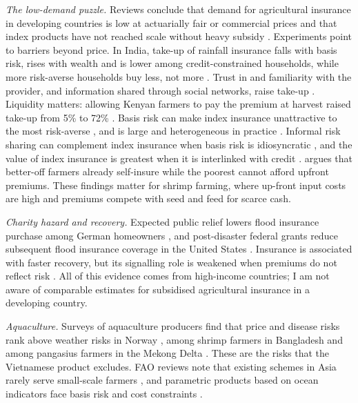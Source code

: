 \documentclass[11pt,a4paper]{article}
\begin{document}
\textit{The low-demand puzzle.} Reviews conclude that demand for agricultural insurance in developing countries is low at actuarially fair or commercial prices and that index products have not reached scale without heavy subsidy \parencite{colexiong2017,carter2017}. Experiments point to barriers beyond price. In India, take-up of rainfall insurance falls with basis risk, rises with wealth and is lower among credit-constrained households, while more risk-averse households buy less, not more \parencite{gine2008}. Trust in and familiarity with the provider, and information shared through social networks, raise take-up \parencite{gine2008,cai2015}. Liquidity matters: allowing Kenyan farmers to pay the premium at harvest raised take-up from 5\% to 72\% \parencite{casaburi2018}. Basis risk can make index insurance unattractive to the most risk-averse \parencite{clarke2016}, and is large and heterogeneous in practice \parencite{jensen2016}. Informal risk sharing can complement index insurance when basis risk is idiosyncratic \parencite{mobarak2013}, and the value of index insurance is greatest when it is interlinked with credit \parencite{carter2016}. \textcite{binswanger2012} argues that better-off farmers already self-insure while the poorest cannot afford upfront premiums. These findings matter for shrimp farming, where up-front input costs are high and premiums compete with seed and feed for scarce cash.

\textit{Charity hazard and recovery.} Expected public relief lowers flood insurance purchase among German homeowners \parencite{andor2020}, and post-disaster federal grants reduce subsequent flood insurance coverage in the United States \parencite{kousky2018}. Insurance is associated with faster recovery, but its signalling role is weakened when premiums do not reflect risk \parencite{kousky2019}. All of this evidence comes from high-income countries; I am not aware of comparable estimates for subsidised agricultural insurance in a developing country.

\textit{Aquaculture.} Surveys of aquaculture producers find that price and disease risks rank above weather risks in Norway \parencite{bergfjord2009}, among shrimp farmers in Bangladesh \parencite{ahsan2011} and among pangasius farmers in the Mekong Delta \parencite{lecheong2010}. These are the risks that the Vietnamese product excludes. FAO reviews note that existing schemes in Asia rarely serve small-scale farmers \parencite{vananrooy2006,secretan2007}, and parametric products based on ocean indicators face basis risk and cost constraints \parencite{hobday2025}.
\end{document}
